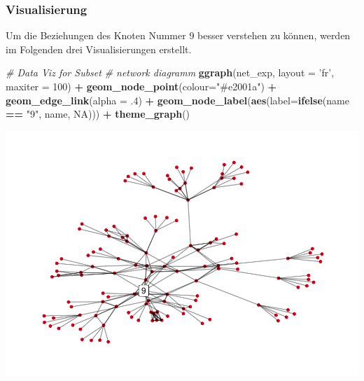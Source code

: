 \documentclass[
  12 pt,
]{article}
\newenvironment{Shaded}{\begin{snugshade}}{\end{snugshade}}
\newcommand{\CommentTok}[1]{\textcolor[rgb]{0.56,0.35,0.01}{\textit{#1}}}
\newcommand{\DataTypeTok}[1]{\textcolor[rgb]{0.13,0.29,0.53}{#1}}
\newcommand{\DecValTok}[1]{\textcolor[rgb]{0.00,0.00,0.81}{#1}}
\newcommand{\FloatTok}[1]{\textcolor[rgb]{0.00,0.00,0.81}{#1}}
\newcommand{\KeywordTok}[1]{\textcolor[rgb]{0.13,0.29,0.53}{\textbf{#1}}}
\newcommand{\NormalTok}[1]{#1}
\newcommand{\OperatorTok}[1]{\textcolor[rgb]{0.81,0.36,0.00}{\textbf{#1}}}
\newcommand{\OtherTok}[1]{\textcolor[rgb]{0.56,0.35,0.01}{#1}}
\newcommand{\StringTok}[1]{\textcolor[rgb]{0.31,0.60,0.02}{#1}}
\begin{document}
\hypertarget{visualisierung}{%
\subsubsection{Visualisierung}\label{visualisierung}}

Um die Beziehungen des Knoten Nummer 9 besser verstehen zu können,
werden im Folgenden drei Visualisierungen erstellt.\\

\begin{Shaded}
\begin{Highlighting}[]
\CommentTok{# Data Viz for Subset}
\CommentTok{# network diagramm}
\KeywordTok{ggraph}\NormalTok{(net_exp, }\DataTypeTok{layout =} \StringTok{'fr'}\NormalTok{, }\DataTypeTok{maxiter =} \DecValTok{100}\NormalTok{) }\OperatorTok{+}\StringTok{ }
\StringTok{  }\KeywordTok{geom_node_point}\NormalTok{(}\DataTypeTok{colour=}\StringTok{"#e2001a"}\NormalTok{) }\OperatorTok{+}\StringTok{ }
\StringTok{  }\KeywordTok{geom_edge_link}\NormalTok{(}\DataTypeTok{alpha =} \FloatTok{.4}\NormalTok{) }\OperatorTok{+}
\StringTok{  }\KeywordTok{geom_node_label}\NormalTok{(}\KeywordTok{aes}\NormalTok{(}\DataTypeTok{label=}\KeywordTok{ifelse}\NormalTok{(name }\OperatorTok{==}\StringTok{ "9"}\NormalTok{, name, }\OtherTok{NA}\NormalTok{))) }\OperatorTok{+}
\StringTok{  }\KeywordTok{theme_graph}\NormalTok{()}
\end{Highlighting}
\end{Shaded}

\includegraphics{Assignment_files/figure-latex/unnamed-chunk-2-1.pdf}
\newpage
\end{document}
